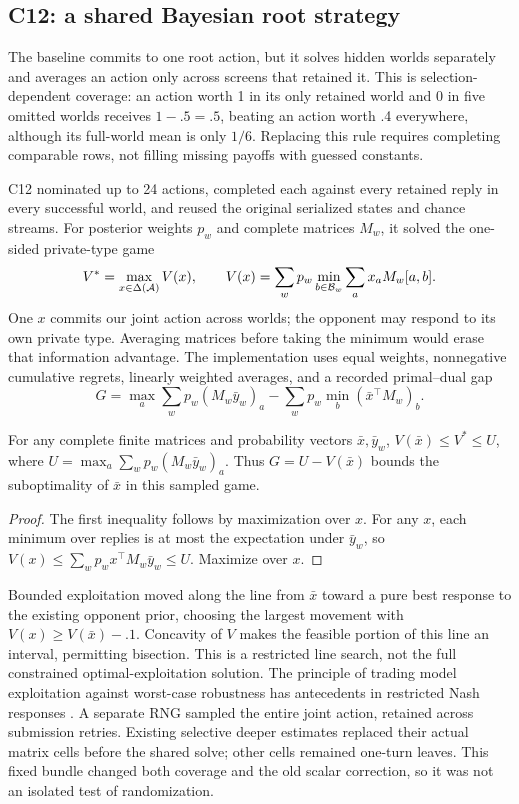 \subsection{C12: a shared Bayesian root strategy}
\label{sec:belief-root}
The baseline commits to one root action, but it solves hidden worlds
separately and averages an action only across screens that retained it.
This is selection-dependent coverage: an action worth 1 in its only retained
world and 0 in five omitted worlds receives $1-.5=.5$, beating an action
worth .4 everywhere, although its full-world mean is only $1/6$.
Replacing this rule requires completing comparable rows, not filling missing
payoffs with guessed constants.

C12 nominated up to 24 actions, completed each against every retained reply
in every successful world, and reused the original serialized states and
chance streams. For posterior weights $p_w$ and complete matrices $M_w$,
it solved the one-sided private-type game
\begin{equation}
  V^*=\max_{x\in\Delta(\mathcal{A})}V(x),\qquad
  V(x)=\sum_w p_w\min_{b\in\mathcal{B}_w}\sum_a x_a M_w[a,b].
  \label{eq:belief-root}
\end{equation}
One $x$ commits our joint action across worlds; the opponent may respond to
its own private type. Averaging matrices before taking the minimum would
erase that information advantage. The implementation uses equal weights,
nonnegative cumulative regrets, linearly weighted averages, and a recorded
primal--dual gap
\begin{equation}
  G=\max_a\sum_w p_w(M_w\bar y_w)_a
       -\sum_w p_w\min_b(\bar x^\top M_w)_b.
\end{equation}

\begin{proposition}
For any complete finite matrices and probability vectors $\bar x,\bar y_w$,
$V(\bar x)\le V^*\le U$, where
$U=\max_a\sum_wp_w(M_w\bar y_w)_a$. Thus $G=U-V(\bar x)$ bounds the
suboptimality of $\bar x$ in this sampled game.
\end{proposition}
\begin{proof}
The first inequality follows by maximization over $x$. For any $x$, each
minimum over replies is at most the expectation under $\bar y_w$, so
$V(x)\le\sum_wp_wx^\top M_w\bar y_w\le U$. Maximize over $x$.
\end{proof}

Bounded exploitation moved along the line from $\bar x$ toward a pure best
response to the existing opponent prior, choosing the largest movement with
$V(x)\ge V(\bar x)-.1$. Concavity of $V$ makes the feasible portion of this
line an interval, permitting bisection. This is a restricted line search,
not the full constrained optimal-exploitation solution. The principle of
trading model exploitation against worst-case robustness has antecedents in
restricted Nash responses \citep{rnash2007}. A separate RNG sampled the
entire joint action, retained across submission retries. Existing selective
deeper estimates replaced their actual matrix cells before the shared solve;
other cells remained one-turn leaves. This fixed bundle changed both coverage
and the old scalar correction, so it was not an isolated test of randomization.

